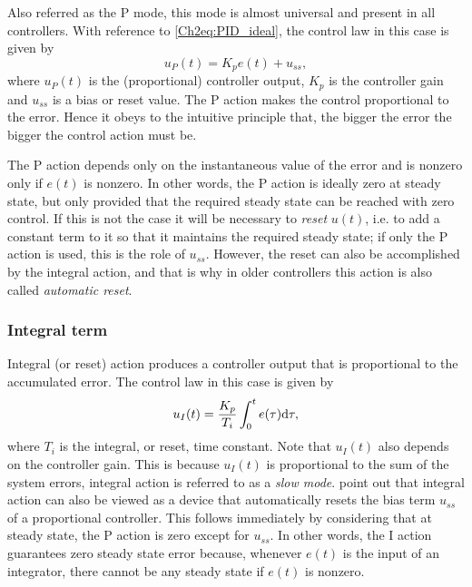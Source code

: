 Also referred as the P mode, this mode is almost universal and present in all controllers. With reference to \eqref{Ch2eq:PID_ideal}, the control law in this case is given by
%
\begin{equation*}
u_P (t) = K_pe(t) + u_{ss},
\end{equation*}
%
where $u_P(t)$ is the (proportional) controller output, $K_p$ is the controller gain and $u_{ss}$ is a bias or reset value. The P action makes the control proportional to the error. Hence it obeys to the intuitive principle that, the bigger the error the bigger the control action must be.

The P action depends only on the instantaneous value of the error and is nonzero only if $e(t)$ is nonzero. In other words, the P action is ideally zero at steady state, but only provided that the required steady state can be reached with zero control. If this is not the case it will be necessary to \emph{reset} $u(t)$, i.e. to add a constant term to it so that it maintains the required steady state; if only the P action is used, this is the role of $u_{ss}$. However, the reset can also be accomplished by the integral action, and that is why  in older controllers this action is also called \emph{automatic reset}. 


\subsubsection*{Integral term}
%
Integral (or reset) action produces a controller output that is proportional to the accumulated error. The control law in this case is given by
%
\begin{equation*}
	u_I( t ) = \frac{K_p}{T_i}\int_0^t e(\tau)\mathrm{d} \tau,
\end{equation*}
%
where $T_i$ is the integral, or reset, time constant. Note that $u_I(t)$ also depends on the controller gain. This is because  $u_I(t)$ is proportional to the sum of the system errors, integral action is referred to as a \emph{slow mode}. \citet{astromhagglund2006} point out that integral action can also be viewed as a device that automatically resets the bias term $u_{ss}$ of a proportional controller. This follows immediately by considering that at steady state,  the P action is zero except for $u_{ss}$. In other words, the I action guarantees zero steady state error because, whenever $e(t)$ is the input of an integrator, there cannot be any steady state if $e(t)$ is nonzero.

